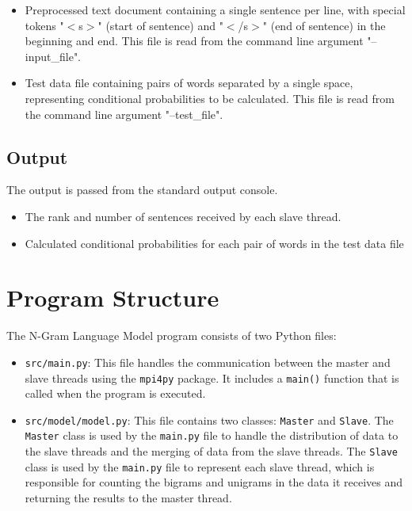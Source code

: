 \documentclass[12pt, A4, titlepage]{article}
\begin{document}
\begin{itemize}
    \item Preprocessed text document containing a single sentence per line, with special tokens "$<$s$>$" (start of sentence) and "$<$/s$>$" (end of sentence) in the beginning and end. This file is read from the command line argument "--input\_file".
    \item Test data file containing pairs of words separated by a single space, representing conditional probabilities to be calculated. This file is read from the command line argument "--test\_file".
\end{itemize}

\subsection{Output}

The output is passed from the standard output console. 

\begin{itemize}
    \item The rank and number of sentences received by each slave thread. 
    \item Calculated conditional probabilities for each pair of words in the test data file
\end{itemize}

\section{Program Structure}

The N-Gram Language Model program consists of two Python files:

\begin{itemize}
    \item \texttt{src/main.py}: This file handles the communication between the master and slave threads using the \texttt{mpi4py} package. It includes a \texttt{main()} function that is called when the program is executed.
    \item \texttt{src/model/model.py}: This file contains two classes: \texttt{Master} and \texttt{Slave}. The \texttt{Master} class is used by the \texttt{main.py} file to handle the distribution of data to the slave threads and the merging of data from the slave threads. The \texttt{Slave} class is used by the \texttt{main.py} file to represent each slave thread, which is responsible for counting the bigrams and unigrams in the data it receives and returning the results to the master thread.
\end{itemize}
\end{document}
